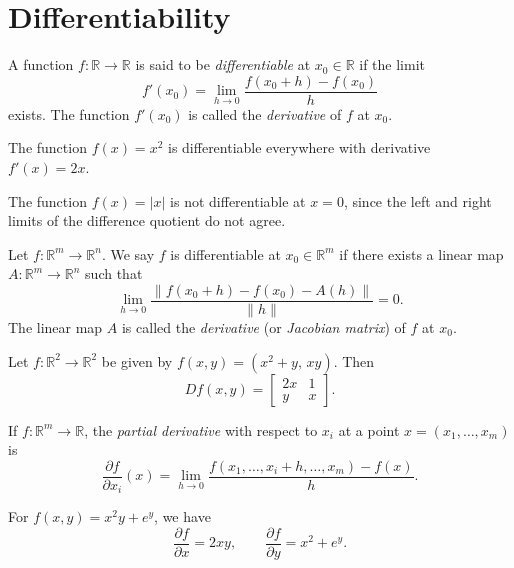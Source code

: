 \section{Differentiability}

\begin{definition}
A function $f:\mathbb{R}\to \mathbb{R}$ is said to be \emph{differentiable} at $x_0\in \mathbb{R}$ if the limit
\[
f'(x_0) = \lim_{h\to 0} \frac{f(x_0+h)-f(x_0)}{h}
\]
exists. The function $f'(x_0)$ is called the \emph{derivative} of $f$ at $x_0$.
\end{definition}

\begin{example}
The function $f(x)=x^2$ is differentiable everywhere with derivative $f'(x)=2x$.
\end{example}

\begin{example}
The function $f(x)=|x|$ is not differentiable at $x=0$, since the left and right limits of the difference quotient do not agree.
\end{example}


\begin{definition}
Let $f:\mathbb{R}^m\to \mathbb{R}^n$. We say $f$ is differentiable at $x_0\in \mathbb{R}^m$ if there exists a linear map 
$A:\mathbb{R}^m\to \mathbb{R}^n$ such that
\[
\lim_{h\to 0}\frac{\|f(x_0+h)-f(x_0)-A(h)\|}{\|h\|} = 0.
\]
The linear map $A$ is called the \emph{derivative} (or \emph{Jacobian matrix}) of $f$ at $x_0$.
\end{definition}

\begin{example}
Let $f:\mathbb{R}^2\to \mathbb{R}^2$ be given by $f(x,y)=(x^2+y,\, xy)$.  
Then 
\[
Df(x,y) = \begin{bmatrix}
2x & 1\\
y & x
\end{bmatrix}.
\]
\end{example}

\begin{definition}
If $f:\mathbb{R}^m\to \mathbb{R}$, the \emph{partial derivative} with respect to $x_i$ at a point $x=(x_1,\dots,x_m)$ is
\[
\frac{\partial f}{\partial x_i}(x) = \lim_{h\to 0} \frac{f(x_1,\dots,x_i+h,\dots,x_m)-f(x)}{h}.
\]
\end{definition}

\begin{example}
For $f(x,y)=x^2y+e^y$, we have
\[
\frac{\partial f}{\partial x} = 2xy, \qquad \frac{\partial f}{\partial y} = x^2+e^y.
\]
\end{example}

